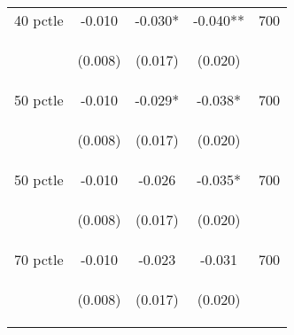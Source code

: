 \begin{tabular}{lcccc}
40 pctle     &  -0.010    &    -0.030*   &     -0.040**  &  700 \\

\vspace{4pt} &  \begin{footnotesize}(0.008)\end{footnotesize}   &
			    \begin{footnotesize}(0.017)\end{footnotesize}   &
			    \begin{footnotesize}(0.020)\end{footnotesize}   &
			     \\          


50 pctle    &  -0.010    &   -0.029*    &     -0.038*  &  700  \\

\vspace{4pt} &  \begin{footnotesize}(0.008)\end{footnotesize}   &
			    \begin{footnotesize}(0.017)\end{footnotesize}   &
			    \begin{footnotesize}(0.020)\end{footnotesize}   &
			     \\          


50 pctle   &  -0.010    &   -0.026    &     -0.035*  &  700  \\

\vspace{4pt}   &  \begin{footnotesize}(0.008)\end{footnotesize}   &
			    \begin{footnotesize}(0.017)\end{footnotesize}   &
			    \begin{footnotesize}(0.020)\end{footnotesize}   &
			     \\          



70 pctle    &  -0.010    &   -0.023    &     -0.031  &  700  \\

\vspace{4pt} &  \begin{footnotesize}(0.008)\end{footnotesize}   &
			    \begin{footnotesize}(0.017)\end{footnotesize}   &
			    \begin{footnotesize}(0.020)\end{footnotesize}   &
			     \\          




\end{tabular}
